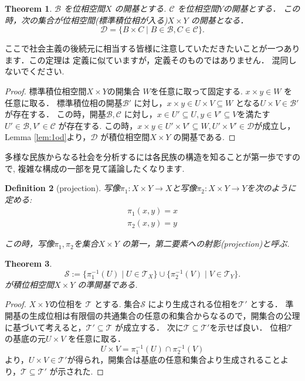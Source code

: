 \documentclass[dvipdfmx]{jbook}
\newtheorem{theorem}{Theorem}[section]
\newtheorem{definition}[theorem]{Definition}
\theoremstyle{remark}
\theoremstyle{plain}
\begin{document}
\begin{theorem}
$\mathcal{B}$ を位相空間$X$ の開基とする.
$\mathcal{C}$ を位相空間$Y$の開基とする．
この時，次の集合が位相空間(標準積位相が入る)$X \times Y$ の開基となる．
\[
\mathcal{D}= \{B \times C  \mid B \in \mathcal{B} , C \in \mathcal{C} \}
.\] 
\end{theorem}

ここで社会主義の後続元に相当する皆様に注意していただきたいことが一つあります．この定理は
定義に似ていますが，定義そのものではありません． 混同しないでください.
\begin{proof}
	標準積位相空間$X \times Y$の開集合 $W$を任意に取って固定する. 
	$x\times y \in W$ を任意に取る．
	標準積位相の開基$\mathcal{B'}$ に対し，$x \times y \in U \times V \subseteq W$ となる$U \times V \in \mathcal{B'}$ が存在する．
	この時，開基$\mathcal{B},\mathcal{C}$ に対し，$x \in U' \subseteq U, y \in V' \subseteq V$を満たす $U' \in \mathcal{B},V' \in \mathcal{C}$ が存在する.
	この時，$x\times y \in U' \times V' \subseteq W,U' \times V' \in \mathcal{D}$が成立し，Lemma \ref{lem:1od}より，$\mathcal{D}$ が積位相空間$X\times Y$ の開基である.
\end{proof}

多様な民族からなる社会を分析するには各民族の構造を知ることが第一歩ですので, 複雑な構成の一部を見て議論したくなります.

\begin{definition}[projection]
	写像$\pi_1 : X \times Y \to X$と写像$\pi_2 : X \times Y \to Y$を次のように定める:
	\[
	\begin{aligned}
		\pi_1(x,y) =x \\
		\pi_2(x,y)=y
	\end{aligned}
	\] 

	この時，写像$\pi_1,\pi_2$を集合$X \times Y$ の第一，第二要素への射影(projection)と呼ぶ.
\end{definition}

\begin{theorem}
	\[
	\mathcal{S}:= \{\pi_1^{-1} \left( U \right)  \mid U \in \mathcal{T}_X		\} \cup \{ \pi_2^{-1} \left( V \right)   \mid  V \in \mathcal{T}_Y\} 
	.\] 
	が積位相空間$X \times Y$ の準開基である.
\end{theorem}

\begin{proof}
	$X\times Y$の位相を $\mathcal{T}$ とする.
	集合$\mathcal{S}$ により生成される位相を$\mathcal{T}'$ とする．
	準開基の生成位相は有限個の共通集合の任意の和集合からなるので，開集合の公理に基づいて考えると，$\mathcal{T}' \subseteq \mathcal{T}$ が成立する．
	次に$\mathcal{T} \subseteq \mathcal{T}'$を示せば良い．
	位相$\mathcal{T}$ の基底の元$U\times V $ を任意に取る．
	$$
	U \times V = \pi_1^{-1}\left( U \right) \cap \pi_2^{-1}\left( V \right)  
	$$
	より，$U \times V \in \mathcal{T}'$が得られ，開集合は基底の任意和集合より生成されることより，$\mathcal{T} \subseteq \mathcal{T}'$ が示された.
\end{proof}
\end{document}
